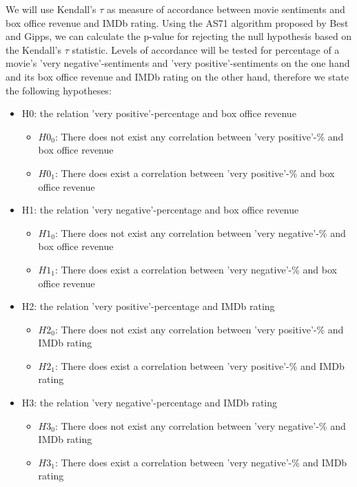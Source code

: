 \documentclass{sig-alternate-br}
\begin{document}
We will use Kendall's $\tau$\cite{Kendall1938} as measure of accordance between movie sentiments and box office revenue and IMDb rating. Using the AS71 algorithm proposed by Best and Gipps\cite{Best1974}, we can calculate the p-value for rejecting the null hypothesis based on the Kendall's $\tau$ statistic. Levels of accordance will be tested for percentage of a movie's 'very negative'-sentiments and 'very positive'-sentiments on the one hand and its box office revenue and IMDb rating on the other hand, therefore we state the following hypotheses:
\begin{itemize}\itemsep1pt \parskip0pt 
	\item H0: the relation 'very positive'-percentage and box office revenue
	\begin{itemize}\itemsep1pt \parskip0pt 
		\item $H0_0$: There does not exist any correlation between 'very positive'-\% and box office revenue
		\item $H0_1$: There does exist a correlation between 'very positive'-\% and box office revenue
	\end{itemize}
	\item H1: the relation 'very negative'-percentage and box office revenue
	\begin{itemize}\itemsep1pt \parskip0pt 
		\item $H1_0$: There does not exist any correlation between 'very negative'-\% and box office revenue
		\item $H1_1$: There does exist a correlation between 'very negative'-\% and box office revenue
	\end{itemize}
	\item H2: the relation 'very positive'-percentage and IMDb rating
	\begin{itemize}\itemsep1pt \parskip0pt 
		\item $H2_0$: There does not exist any correlation between 'very positive'-\% and IMDb rating
		\item $H2_1$: There does exist a correlation between 'very positive'-\% and IMDb rating
	\end{itemize}
	\item H3: the relation 'very negative'-percentage and IMDb rating
	\begin{itemize}\itemsep1pt \parskip0pt 
		\item $H3_0$: There does not exist any correlation between 'very negative'-\% and IMDb rating
		\item $H3_1$: There does exist a correlation between 'very negative'-\% and IMDb rating
	\end{itemize}
\end{itemize}
\end{document}
